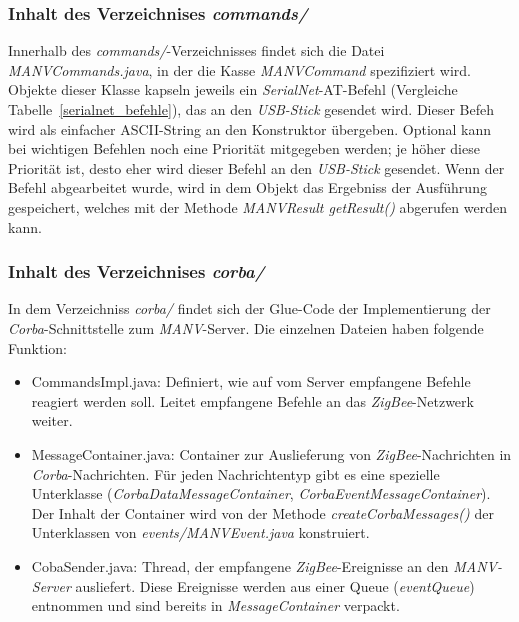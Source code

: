     \subsubsection{Inhalt des Verzeichnises \emph{commands/}}

    Innerhalb des \emph{commands/}-Verzeichnisses findet sich die Datei \emph{MANVCommands.java},
    in der die Kasse \emph{MANVCommand} spezifiziert wird. Objekte dieser Klasse kapseln jeweils
    ein \emph{SerialNet}-AT-Befehl (Vergleiche Tabelle~\ref{serialnet_befehle}), das an den
    \emph{USB-Stick} gesendet wird. Dieser Befeh wird als einfacher ASCII-String an den Konstruktor
    übergeben. Optional kann bei wichtigen Befehlen noch eine Priorität mitgegeben werden;
    je höher diese Priorität ist, desto eher wird dieser Befehl an den \emph{USB-Stick}
    gesendet. Wenn der Befehl abgearbeitet wurde, wird in dem Objekt das Ergebniss
    der Ausführung gespeichert, welches mit der Methode \emph{MANVResult getResult()}
    abgerufen werden kann.

    \subsubsection{Inhalt des Verzeichnises \emph{corba/}}

    In dem Verzeichniss \emph{corba/} findet sich der Glue-Code der Implementierung der \emph{Corba}-Schnittstelle
    zum \emph{MANV}-Server. Die einzelnen Dateien haben folgende Funktion:

    \begin{itemize}
        \item{CommandsImpl.java:} Definiert, wie auf vom Server empfangene Befehle reagiert werden soll.
                                  Leitet empfangene Befehle an das \emph{ZigBee}-Netzwerk weiter.
        \item{MessageContainer.java:} Container zur Auslieferung von \emph{ZigBee}-Nachrichten in \emph{Corba}-Nachrichten.
                                      Für jeden Nachrichtentyp gibt es eine spezielle Unterklasse 
                                      (\emph{CorbaDataMessageContainer},
                                      \emph{CorbaEventMessageContainer}). Der Inhalt der Container wird von der Methode 
                                      \emph{createCorbaMessages()} der Unterklassen von \emph{events/MANVEvent.java}
                                      konstruiert.
        \item{CobaSender.java:} Thread, der empfangene \emph{ZigBee}-Ereignisse an den \emph{MANV-Server} ausliefert.
                                Diese Ereignisse werden aus einer Queue (\emph{eventQueue}) entnommen und sind
                                bereits in \emph{MessageContainer} verpackt.
    \end{itemize}

